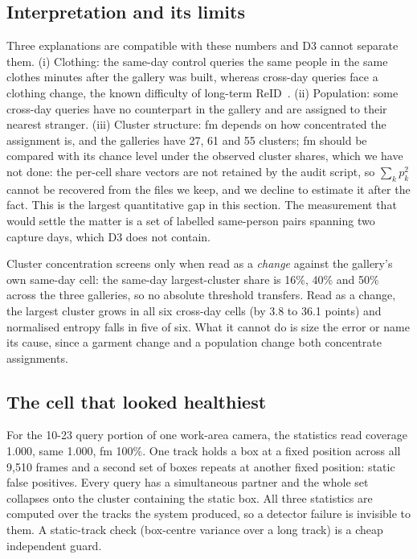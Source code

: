 \documentclass[journal]{IEEEtran}
\begin{document}
\subsection{Interpretation and its limits}
Three explanations are compatible with these numbers and D3 cannot separate them. (i) Clothing: the same-day control queries the same people in the same clothes minutes after the gallery was built, whereas cross-day queries face a clothing change, the known difficulty of long-term ReID~\cite{yang2021,gu2022}. (ii) Population: some cross-day queries have no counterpart in the gallery and are assigned to their nearest stranger. (iii) Cluster structure: fm depends on how concentrated the assignment is, and the galleries have 27, 61 and 55 clusters; fm should be compared with its chance level under the observed cluster shares, which we have not done: the per-cell share vectors are not retained by the audit script, so $\sum_k p_k^2$ cannot be recovered from the files we keep, and we decline to estimate it after the fact. This is the largest quantitative gap in this section. The measurement that would settle the matter is a set of labelled same-person pairs spanning two capture days, which D3 does not contain.

Cluster concentration screens only when read as a \emph{change} against the gallery's own same-day cell: the same-day largest-cluster share is 16\%, 40\% and 50\% across the three galleries, so no absolute threshold transfers. Read as a change, the largest cluster grows in all six cross-day cells (by 3.8 to 36.1 points) and normalised entropy falls in five of six. What it cannot do is size the error or name its cause, since a garment change and a population change both concentrate assignments.

\subsection{The cell that looked healthiest}\label{sec:broken}
For the 10-23 query portion of one work-area camera, the statistics read coverage 1.000, same 1.000, fm 100\%. One track holds a box at a fixed position across all 9,510 frames and a second set of boxes repeats at another fixed position: static false positives. Every query has a simultaneous partner and the whole set collapses onto the cluster containing the static box. All three statistics are computed over the tracks the system produced, so a detector failure is invisible to them. A static-track check (box-centre variance over a long track) is a cheap independent guard.
\end{document}
